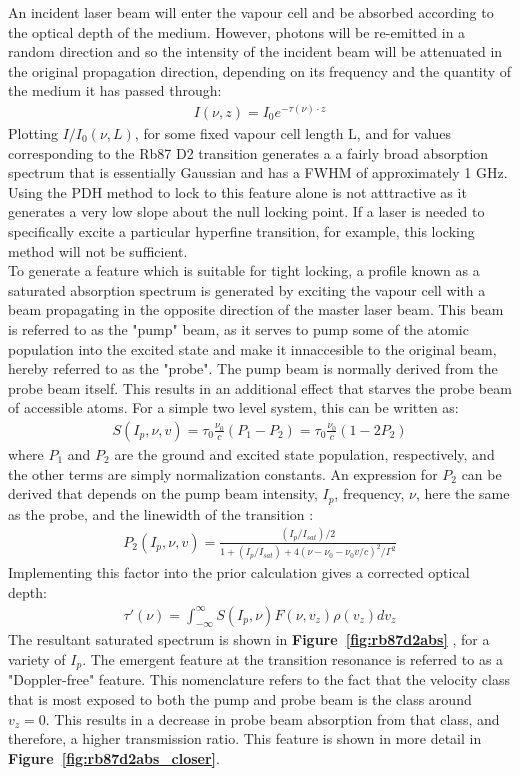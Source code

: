 An incident laser beam will enter the vapour cell and be absorbed according to
the optical depth of the medium. However, photons will be re-emitted in a random
direction and so the intensity of the incident beam will be attenuated in the
original propagation direction, depending on its frequency and the quantity
of the medium it has passed through:
\begin{gather}
  I(\nu, z) = I_0 e^{-\tau(\nu)\cdot z}
\end{gather}
Plotting $I/I_0 (\nu, L)$, for some fixed vapour cell length L, and for
values corresponding to the Rb87 D2 transition generates a
a fairly broad absorption spectrum that is essentially Gaussian and has a
FWHM of approximately 1 GHz. Using the PDH method to lock to this feature
alone is not atttractive as it generates a very low slope about the null locking
point. If a laser is needed to specifically excite a particular hyperfine
transition, for example, this locking method will not be sufficient. \\

To generate a feature which is suitable for tight locking, a profile known as a
saturated absorption spectrum is generated by exciting the vapour cell with
a beam propagating in the opposite direction of the master laser beam. This beam
is referred to as the "pump" beam, as it serves to pump some of the atomic
population into the excited state and make it innaccesible to the original beam,
hereby referred to as the "probe". The pump beam is normally derived from the
probe beam itself. This results in an additional effect that starves the probe
beam of accessible atoms. For a simple two level system, this can be written as:
\begin{gather}
  S(I_p, \nu, v) = \tau_0 \frac{\nu_0}{c} (P_1 - P_2) =
    \tau_0 \frac{\nu_0}{c} (1 - 2 P_2)
\end{gather}
where $P_1$ and $P_2$ are the ground and excited state population, respectively,
and the other terms are simply normalization constants. An expression for
$P_2$ can be derived that depends on the pump beam intensity, $I_p$, frequency,
$\nu$, here the same as the probe, and the linewidth of the transition
\cite{maguire2006}:
\begin{gather}
  P_2(I_p, \nu, v) = \frac{ (I_p/I_{sat})/2}{1 + (I_p/I_{sat}) +
    4(\nu - \nu_0 - \nu_0 v/c)^2/\Gamma^2}
\end{gather}
Implementing this factor into the prior calculation gives a corrected optical
depth:
\begin{gather}\label{eq:corr_opt_depth}
  \tau'(\nu) = \int_{-\infty}^\infty S(I_p, \nu) F(\nu, v_z) \rho(v_z) dv_z
\end{gather}
The resultant saturated spectrum is shown in \textbf{Figure~\ref{fig:rb87d2abs}}
, for a variety of $I_p$. The emergent feature at the transition resonance is
referred to as a "Doppler-free" feature. This nomenclature refers to the fact
that the velocity class that is most exposed to both the pump and probe beam
is the class around $v_z = 0$. This results in a decrease in probe beam
absorption from that class, and therefore, a higher transmission ratio.
This feature is shown in more detail in \textbf{Figure~\ref{fig:rb87d2abs_closer}}.

